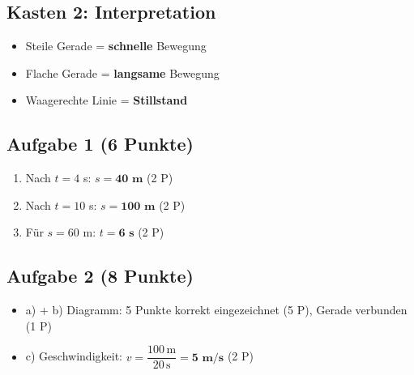 \documentclass[11pt,a4paper]{article}
\begin{document}
\subsection*{Kasten 2: Interpretation}
\begin{itemize}[leftmargin=2em]
    \item Steile Gerade = \textbf{schnelle} Bewegung
    \item Flache Gerade = \textbf{langsame} Bewegung
    \item Waagerechte Linie = \textbf{Stillstand}
\end{itemize}

\subsection*{Aufgabe 1 (6 Punkte)}
\begin{enumerate}[label=\alph*)]
    \item Nach $t = 4$ s: $s = \textbf{40 m}$ \hfill (2 P)
    \item Nach $t = 10$ s: $s = \textbf{100 m}$ \hfill (2 P)
    \item Für $s = 60$ m: $t = \textbf{6 s}$ \hfill (2 P)
\end{enumerate}

\subsection*{Aufgabe 2 (8 Punkte)}
\begin{itemize}[leftmargin=2em]
    \item a) + b) Diagramm: 5 Punkte korrekt eingezeichnet (5 P), Gerade verbunden (1 P)
    \item c) Geschwindigkeit: $v = \dfrac{100\,\text{m}}{20\,\text{s}} = \textbf{5 m/s}$ \hfill (2 P)
\end{itemize}

\begin{center}
\end{center}
\end{document}
